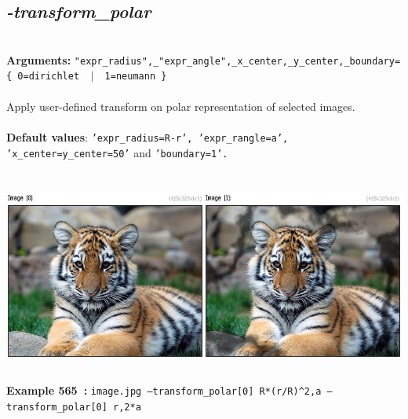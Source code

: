 \documentclass[a4paper,11pt,twoside]{book}
\begin{document}
\subsection{\emph{-transform\_polar} }\vspace*{-0.5em}
~\\\textbf{Arguments: } 
{\small \texttt{"expr\_radius",\_"expr\_angle",\_x\_center,\_y\_center,\_boundary=\{ 0=dirichlet ~$|$~ 1=neumann \}}}\\~\\
Apply user-defined transform on polar representation of selected images.
~\\~\\\textbf{Default values}: {\small \texttt{'expr\_radius=R-r', 'expr\_rangle=a', 'x\_center=y\_center=50'} and \texttt{'boundary=1'.}}
\begin{center}\includegraphics[keepaspectratio=true,height=7cm,width=\textwidth]{img/gmic_def565.jpg}\\
{\footnotesize \textbf{Example 565~:} \texttt{image.jpg --transform\_polar[0] R*(r/R)\textasciicircum 2,a --transform\_polar[0] r,2*a}}
\end{center}
\end{document}
